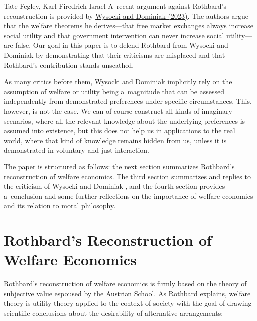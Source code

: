 \begin{artengenv2auth}{Tate Fegley, Karl-Firedrich Israel}
A~recent argument against Rothbard's reconstruction is provided by \href{https://www.zotero.org/google-docs/?CcG5f3}{Wysocki and}\href{https://www.zotero.org/google-docs/?CcG5f3}{ Dominiak }\label{ref:RNDvZAcMn6xM2}\href{https://www.zotero.org/google-docs/?CcG5f3}{(2023)}. The authors argue that the welfare theorems he derives---that free market exchanges always increase social utility and that government intervention can never increase social utility---are false. Our goal in this paper is to defend Rothbard from Wysocki and Dominiak 
\parencite*[][]{wysocki_how_2023} %
 by demonstrating that their criticisms are misplaced and that Rothbard's contribution stands unscathed.



As many critics before them, Wysocki and Dominiak implicitly rely on the assumption of welfare or utility being a~magnitude that can be assessed independently from demonstrated preferences under specific circumstances. This, however, is not the case. We can of course construct all kinds of imaginary scenarios, where all the relevant knowledge about the underlying preferences is assumed into existence, but this does not help us in applications to the real world, where that kind of knowledge remains hidden from us, unless it is demonstrated in voluntary and just interaction.



The paper is structured as follows: the next section summarizes Rothbard's reconstruction of welfare economics. The third section summarizes and replies to the criticism of Wysocki and Dominiak 
\parencite*[][]{wysocki_how_2023}, %
 and the fourth section provides a~conclusion and some further reflections on the importance of welfare economics and its relation to moral philosophy.



\section{Rothbard's Reconstruction of Welfare Economics}

Rothbard's reconstruction of welfare economics is firmly based on the theory of subjective value espoused by the Austrian School. As Rothbard explains, welfare theory is utility theory applied to the context of society with the goal of drawing scientific conclusions about the desirability of alternative arrangements:




\end{artengenv2auth}
